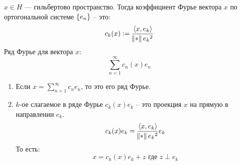 \begin{definition}
    $x \in H$ --- гильбертово пространство.
    Тогда коэффициент Фурье вектора $x$ по ортогональной системе $\set{e_n}$ -- это: 
    $$c_k(x) := \dfrac{\dotprod{x}{e_k}}{\norm{e_k}^2}$$ 
    Ряд Фурье для вектора $x$:
    $$\sum\limits_{n=1}^\infty c_n(x) e_n$$ 
\end{definition}

\begin{observation} \quad 

    \begin{enumerate}
        \item Если $x = \sum\limits_{n=1}^\infty c_n e_n$, то это его ряд Фурье.
        \item $k$-ое слагаемое в ряде Фурье $c_k(x) e_k$ -- это проекция $x$ на прямую в направлении $e_k$.
        $$c_k(x) e_k = \dfrac{\dotprod{x}{e_k}}{\norm{e_k}^2} e_k$$
        То есть:
        $$x = c_k(x)e_k + z \text { где } z \perp e_k$$
    \end{enumerate}
\end{observation}


\newpage

